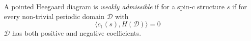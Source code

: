 

    A pointed Heegaard diagram is \emph{weakly admissible} if for a spin-c structure $s$ if for every non-trivial periodic domain $\mathcal D$ with 
    \[\langle c_1(s), H(\mathcal D)\rangle = 0\]
    $\mathcal D$ has both positive and negative coefficients.
